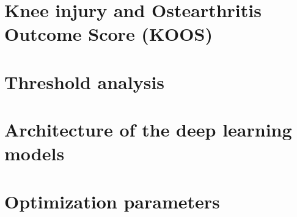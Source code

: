 %




\begingroup
\raggedright



%
%

\endgroup

\appendix

\chapter{\large Knee injury and Ostearthritis Outcome Score (KOOS) \citep{KOOS2016}}\label{app:KOOS}


\chapter{\large Threshold analysis}\label{app:thresholds}




\chapter{\large Architecture of the deep learning models}\label{app:model}



\chapter{\large Optimization parameters} \label{app:opti}


